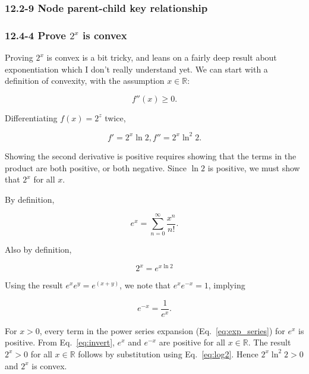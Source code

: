 \documentclass{article}
\begin{document}
\subsubsection{12.2-9 Node parent-child key relationship}


\subsubsection{12.4-4 Prove $2^x$ is convex}

Proving $2^x$ is convex is a bit tricky, and leans on a fairly deep result about
exponentiation which I don't really understand yet. We can start with a definition
of convexity, with the assumption $x\in\mathbb{R}$:

\begin{equation}
  f''(x) \geq 0.
\end{equation}

Differentiating $f(x) = 2^z$ twice,

\begin{equation}
  f' = 2^x \ln 2, f'' = 2^x\ln^2 2.
\end{equation}

Showing the second derivative is positive requires showing that the
terms in the product are both positive, or both negative. Since $\ln 2$
is positive, we must show that $2^x$ for all $x$.

By definition,

\begin{equation}\label{eq:exp_series}
  e^x = \sum_{n=0}^\infty \frac{x^n}{n!}.
\end{equation}

Also by definition,

\begin{equation}\label{eq:log2}
  2^x = e^{x\ln 2}
\end{equation}

Using the result $e^xe^y = e^{(x+y)}$, we note that $e^xe^{-x} = 1$, implying

\begin{equation}\label{eq:invert}
  e^{-x} = \frac{1}{e^x}.
\end{equation}

For $x > 0$, every term in the power series expansion
(Eq.~\ref{eq:exp_series}) for $e^x$ is positive.
From Eq.~\ref{eq:invert}, $e^x$ and $e^{-x}$ are positive for all $x\in\mathbb{R}$. The result
$2^x > 0$ for all $x\in\mathbb{R}$ follows by substitution using
Eq.~\ref{eq:log2}. Hence $2^x\ln^2 2 > 0$ and $2^x$ is convex.
\end{document}
